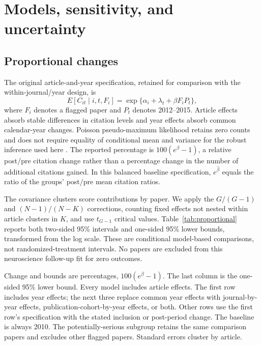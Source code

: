 \documentclass[11pt,letterpaper]{article}
\begin{document}
\section{Models, sensitivity, and uncertainty}\label{app:inference}
\subsection{Proportional changes}
The original article-and-year specification, retained for comparison with the within-journal/year design, is
\[
 E[C_{it}\mid i,t,F_i]=\exp\{\alpha_i+\lambda_t+\beta F_i P_t\},
\]
where $F_i$ denotes a flagged paper and $P_t$ denotes 2012--2015. Article effects absorb stable differences in citation levels and year effects absorb common calendar-year changes. Poisson pseudo-maximum likelihood retains zero counts and does not require equality of conditional mean and variance for the robust inference used here \citep{santos2006}. The reported percentage is $100(e^\beta-1)$, a relative post/pre citation change rather than a percentage change in the number of additional citations gained. In this balanced baseline specification, $e^{\widehat\beta}$ equals the ratio of the groups' post/pre mean citation ratios.

The covariance clusters score contributions by paper. We apply the $G/(G-1)$ and $(N-1)/(N-K)$ corrections, counting fixed effects not nested within article clusters in $K$, and use $t_{G-1}$ critical values. Table~\ref{tab:proportional} reports both two-sided 95\% intervals and one-sided 95\% lower bounds, transformed from the log scale. These are conditional model-based comparisons, not randomized-treatment intervals. No papers are excluded from this neuroscience follow-up fit for zero outcomes.

\begin{table}[htbp]
\centering
\caption{Proportional citation comparisons}
\label{tab:proportional}
\small

\par\smallskip
\begin{minipage}{\linewidth}\footnotesize
Change and bounds are percentages, $100(e^\beta-1)$. The last column is the one-sided 95\% lower bound. Every model includes article effects. The first row includes year effects; the next three replace common year effects with journal-by-year effects, publication-cohort-by-year effects, or both. Other rows use the first row's specification with the stated inclusion or post-period change. The baseline is always 2010. The potentially-serious subgroup retains the same comparison papers and excludes other flagged papers. Standard errors cluster by article.
\end{minipage}
\end{table}
\end{document}
